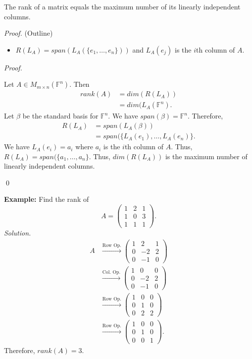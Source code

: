 \documentclass[12pt]{article}
\newenvironment{theorem}[2][Theorem]{\begin{trivlist}
\item[\hskip \labelsep {\bfseries #1}\hskip \labelsep {\bfseries #2.}]}{\end{trivlist}}
\newenvironment{sol}
    {\emph{Proof.}
    }
    {
    \qed
    }
\begin{document}
\begin{theorem}{3.5}
The rank of a matrix equals the maximum number of its linearly independent columns.
\end{theorem}

\textit{Proof.} (Outline)
\begin{itemize}
    \item $R(L_A) = span(L_A (\{e_1, \dots, e_n\}))$ and $L_A(e_j)$ is the $i$th column of $A$.
\end{itemize}

\begin{sol}
Let $A \in M_{m \times n}(\mathbb{F}^n)$. Then \begin{align*}
    rank(A) &= dim(R(L_A)) \\
    &= dim(L_A(\mathbb{F}^n).
\end{align*} Let $\beta$ be the standard basis for $\mathbb{F}^n$. We have $span(\beta) = \mathbb{F}^n$. Therefore, \begin{align*}
    R(L_A) &= span(L_A(\beta)) \\
    &= span(\{L_A(e_1), \dots, L_A(e_n)\}.
\end{align*} We have $L_A(e_i) = a_i$ where $a_i$ is the $i$th column of $A$. Thus, $R(L_A) = span(\{ a_1, \dots, a_n \}$. Thus, $dim(R(L_A))$ is the maximum number of linearly independent columns.
\end{sol}

\noindent\textbf{Example:} Find the rank of $$A = \begin{pmatrix}
1 & 2 & 1 \\ 1 & 0 & 3 \\ 1 & 1 & 1
\end{pmatrix}.$$
\textit{Solution.}
\begin{align*}
    A &\xrightarrow{\text{Row Op.}} \begin{pmatrix}
    1 & 2 & 1 \\ 0 & -2 & 2 \\ 0 & -1 & 0
    \end{pmatrix} \\
    &\xrightarrow{\text{Col. Op.}} \begin{pmatrix}
    1 & 0 & 0 \\ 0 & -2 & 2 \\ 0 & -1 & 0
    \end{pmatrix} \\
    &\xrightarrow{\text{Row Op.}} \begin{pmatrix}
    1 & 0 & 0 \\ 0 & 1 & 0 \\ 0 & 2 & 2
    \end{pmatrix} \\ 
    &\xrightarrow{\text{Row Op.}} \begin{pmatrix}
    1 & 0 & 0 \\ 0 & 1 & 0 \\ 0 & 0 & 1
    \end{pmatrix}.
\end{align*} Therefore, $rank(A) = 3$.
\end{document}
